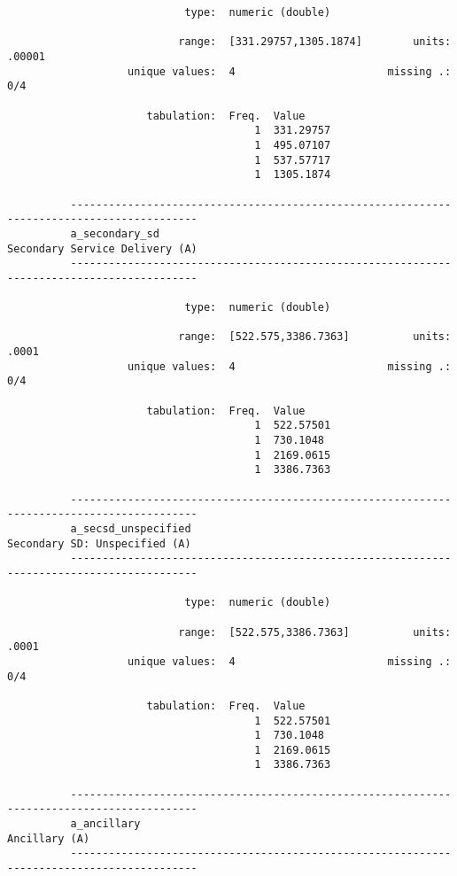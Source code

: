 \documentclass{article}
\begin{document}
\begin{verbatim}
                            type:  numeric (double)
          
                           range:  [331.29757,1305.1874]        units:  .00001
                   unique values:  4                        missing .:  0/4
          
                      tabulation:  Freq.  Value
                                       1  331.29757
                                       1  495.07107
                                       1  537.57717
                                       1  1305.1874
          
          ------------------------------------------------------------------------------------------
          a_secondary_sd                                              Secondary Service Delivery (A)
          ------------------------------------------------------------------------------------------
          
                            type:  numeric (double)
          
                           range:  [522.575,3386.7363]          units:  .0001
                   unique values:  4                        missing .:  0/4
          
                      tabulation:  Freq.  Value
                                       1  522.57501
                                       1  730.1048
                                       1  2169.0615
                                       1  3386.7363
          
          ------------------------------------------------------------------------------------------
          a_secsd_unspecified                                          Secondary SD: Unspecified (A)
          ------------------------------------------------------------------------------------------
          
                            type:  numeric (double)
          
                           range:  [522.575,3386.7363]          units:  .0001
                   unique values:  4                        missing .:  0/4
          
                      tabulation:  Freq.  Value
                                       1  522.57501
                                       1  730.1048
                                       1  2169.0615
                                       1  3386.7363
          
          ------------------------------------------------------------------------------------------
          a_ancillary                                                                  Ancillary (A)
          ------------------------------------------------------------------------------------------
          

\end{verbatim}
\end{document}
